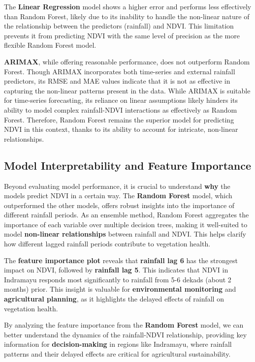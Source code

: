 \documentclass[
]{article}
\begin{document}
The \textbf{Linear Regression} model shows a higher error and performs
less effectively than Random Forest, likely due to its inability to
handle the non-linear nature of the relationship between the predictors
(rainfall) and NDVI. This limitation prevents it from predicting NDVI
with the same level of precision as the more flexible Random Forest
model.

\textbf{ARIMAX}, while offering reasonable performance, does not
outperform Random Forest. Though ARIMAX incorporates both time-series
and external rainfall predictors, its RMSE and MAE values indicate that
it is not as effective in capturing the non-linear patterns present in
the data. While ARIMAX is suitable for time-series forecasting, its
reliance on linear assumptions likely hinders its ability to model
complex rainfall-NDVI interactions as effectively as Random Forest.
Therefore, Random Forest remains the superior model for predicting NDVI
in this context, thanks to its ability to account for intricate,
non-linear relationships.

\subsection{Model Interpretability and Feature
Importance}\label{model-interpretability-and-feature-importance}

Beyond evaluating model performance, it is crucial to understand
\textbf{why} the models predict NDVI in a certain way. The
\textbf{Random Forest} model, which outperformed the other models,
offers robust insights into the importance of different rainfall
periods. As an ensemble method, Random Forest aggregates the importance
of each variable over multiple decision trees, making it well-suited to
model \textbf{non-linear relationships} between rainfall and NDVI. This
helps clarify how different lagged rainfall periods contribute to
vegetation health.

The \textbf{feature importance plot} reveals that \textbf{rainfall lag
6} has the strongest impact on NDVI, followed by \textbf{rainfall lag
5}. This indicates that NDVI in Indramayu responds most significantly to
rainfall from 5-6 dekads (about 2 months) prior. This insight is
valuable for \textbf{environmental monitoring} and \textbf{agricultural
planning}, as it highlights the delayed effects of rainfall on
vegetation health.

By analyzing the feature importance from the \textbf{Random Forest}
model, we can better understand the dynamics of the rainfall-NDVI
relationship, providing key information for \textbf{decision-making} in
regions like Indramayu, where rainfall patterns and their delayed
effects are critical for agricultural sustainability.
\end{document}
